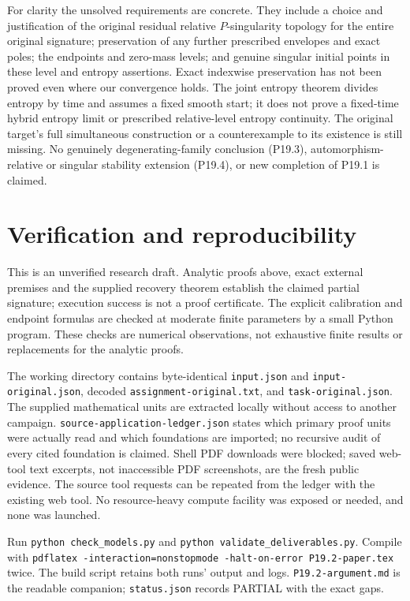 \documentclass[11pt]{article}
\theoremstyle{remark}\newtheorem{remark}[theorem]{Remark}
\begin{document}
For clarity the unsolved requirements are concrete. They include a
choice and justification of the original residual relative
$P$-singularity topology for the entire original signature;
preservation of any further prescribed envelopes and exact poles;
the endpoints
and zero-mass levels; and genuine singular initial points in these
level and entropy assertions. Exact indexwise preservation has not
been proved even where our convergence holds. The joint entropy
theorem divides entropy by time and assumes a fixed smooth start;
it does not prove a fixed-time hybrid entropy limit or prescribed
relative-level entropy continuity. The original target's full
simultaneous construction or a counterexample to its existence
is still missing. No genuinely degenerating-family conclusion
(P19.3), automorphism-relative or singular stability extension
(P19.4), or new completion of P19.1 is claimed.

\section{Verification and reproducibility}
This is an unverified research draft. Analytic proofs above, exact
external premises and the supplied recovery theorem establish the
claimed partial signature; execution success is not a proof
certificate. The explicit calibration and endpoint formulas are
checked at moderate finite parameters by a small Python program.
These checks are numerical observations, not exhaustive finite
results or replacements for the analytic proofs.

The working directory contains byte-identical \texttt{input.json}
and \texttt{input-original.json}, decoded
\texttt{assignment-original.txt}, and \texttt{task-original.json}.
The supplied mathematical units are extracted locally without
access to another campaign. \texttt{source-application-ledger.json}
states which primary proof units were actually read and which
foundations are imported; no recursive audit of every cited
foundation is claimed. Shell PDF downloads were blocked; saved
web-tool text excerpts, not inaccessible PDF screenshots, are the
fresh public evidence. The source tool requests can be repeated
from the ledger with the existing web tool. No resource-heavy
compute facility was exposed or needed, and none was launched.

Run \texttt{python check\_models.py} and
\texttt{python validate\_deliverables.py}. Compile with
\texttt{pdflatex -interaction=nonstopmode -halt-on-error P19.2-paper.tex}
twice. The build script retains both runs' output and logs.
\texttt{P19.2-argument.md} is the readable companion;
\texttt{status.json} records PARTIAL with the exact gaps.
\end{document}

